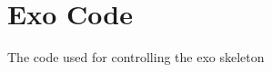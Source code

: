 \href{https://travis-ci.org/naubiomech/ExoCode}{\tt } \href{https://codecov.io/gh/naubiomech/ExoCode}{\tt } \section*{Exo Code}

The code used for controlling the exo skeleton 